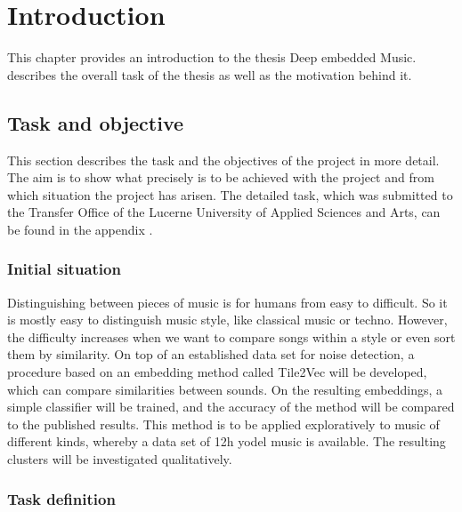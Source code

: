 \chapter{Introduction}
\label{ch:Introduction}

This chapter provides an introduction to the thesis \flqq Deep embedded Music\frqq.  describes the overall task of the thesis as well as the motivation behind it.

\section{Task and objective}
\label{sec:Task-Objective}

This section describes the task and the objectives of the project in more detail. The aim is to show what precisely is to be achieved with the project and from which situation the project has arisen. The detailed task, which was submitted to the Transfer Office of the Lucerne University of Applied Sciences and Arts, can be found in the appendix .

\subsection{Initial situation}
\label{sub:Initial-Stituation}

Distinguishing between pieces of music is for humans from easy to difficult. So it is mostly easy to distinguish music style, like classical music or techno. However, the difficulty increases when we want to compare songs within a style or even sort them by similarity.
\newline
\newline
On top of an established data set for noise detection, a procedure based on an embedding method called Tile2Vec will be developed, which can compare similarities between sounds. On the resulting embeddings, a simple classifier will be trained, and the accuracy of the method will be compared to the published results.
\newline
\newline
This method is to be applied exploratively to music of different kinds, whereby a data set of 12h yodel music is available. The resulting clusters will be investigated qualitatively.

\subsection{Task definition}
\label{sub:Task-Definition}

